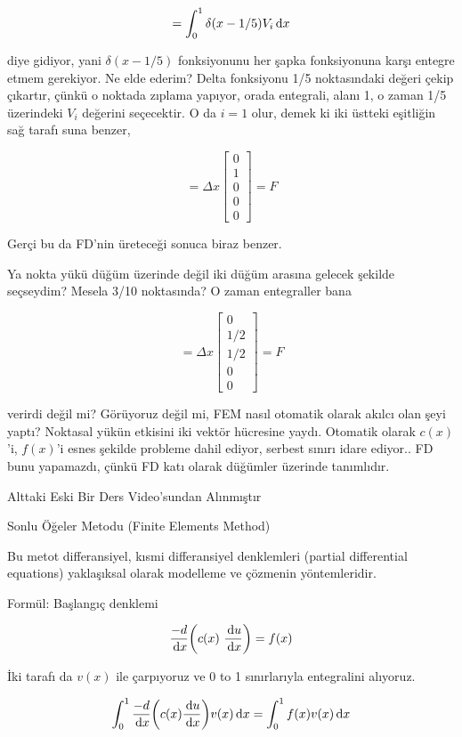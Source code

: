 \documentclass[12pt,fleqn]{article}\usepackage{../../common}
\begin{document}
$$
= \int _{0}^{1} \delta (x-1/5) V_i \,\mathrm{d} x
$$

diye gidiyor, yani $\delta (x-1/5)$ fonksiyonunu her şapka fonksiyonuna karşı
entegre etmem gerekiyor. Ne elde ederim? Delta fonksiyonu 1/5 noktasındaki
değeri çekip çıkartır, çünkü o noktada zıplama yapıyor, orada entegrali, alanı
1, o zaman 1/5 üzerindeki $V_i$ değerini seçecektir. O da $i=1$ olur, demek ki
iki üstteki eşitliğin sağ tarafı suna benzer,

$$
=
\Delta x
\left[\begin{array}{r}
0 \\ 1 \\ 0 \\ 0 \\ 0
\end{array}\right] = F
$$

Gerçi bu da FD'nin üreteceği sonuca biraz benzer.

Ya nokta yükü düğüm üzerinde değil iki düğüm arasına gelecek şekilde seçseydim?
Mesela 3/10 noktasında? O zaman entegraller bana

$$
=
\Delta x
\left[\begin{array}{r}
0 \\ 1/2 \\ 1/2 \\ 0 \\ 0
\end{array}\right] = F
$$

verirdi değil mi? Görüyoruz değil mi, FEM nasıl otomatik olarak akılcı olan şeyi
yaptı? Noktasal yükün etkisini iki vektör hücresine yaydı. Otomatik olarak
$c(x)$'i, $f(x)$'i esnes şekilde probleme dahil ediyor, serbest sınırı idare
ediyor..  FD bunu yapamazdı, çünkü FD katı olarak düğümler üzerinde tanımlıdır.

\newpage

Alttaki Eski Bir Ders Video'sundan Alınmıştır

Sonlu Öğeler Metodu (Finite Elements Method)

Bu metot differansiyel, kısmi differansiyel denklemleri (partial differential
equations) yaklaşıksal olarak modelleme ve çözmenin yöntemleridir.

Formül: Başlangıç denklemi

$$ \frac{-d}{\,\mathrm{d} x} \bigg( c(x) \ \frac{\,\mathrm{d} u}{\,\mathrm{d} x} \bigg) = f(x) $$

İki tarafı da  $v(x)$ ile çarpıyoruz ve 0 to 1 sınırlarıyla entegralini alıyoruz.

$$
\int_0^1 \frac{-d}{\,\mathrm{d} x} \bigg( c(x) \frac{\,\mathrm{d} u}{\,\mathrm{d} x} \bigg) v(x)\,\mathrm{d} x
= \int_0^1 f(x)v(x) \,\mathrm{d} x
$$
\end{document}
